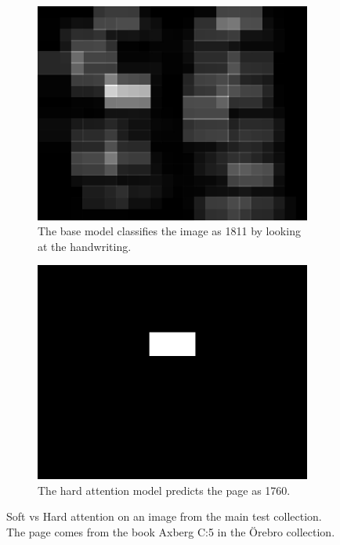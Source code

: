 \begin{figure}
    \begin{subfigure}[t]{0.45\textwidth}
        \centering
        \includegraphics[scale=1.0]{resources/SWE_attention/SoftAtt/att_S3HY-DRC3-H5L.jpg}
        \caption{The base model classifies the image as 1811 by looking at the handwriting.}
    \end{subfigure} \quad %
    \begin{subfigure}[t]{0.45\textwidth}
        \centering    \includegraphics[scale=1.0]{resources/SWE_attention/HardAtt/att_S3HY-DRC3-H5L.jpg}
        \caption{The hard attention model predicts the page as 1760.}
    \end{subfigure}

    \caption{Soft vs Hard attention on an image from the main test collection. The page comes from the book Axberg C:5 in the Örebro collection.}
    \label{fig:attention_dep_H5L}
\end{figure}

